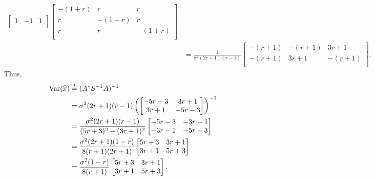 \documentclass{homework}
\begin{document}
\begin{solution}
\begin{align*}
\begin{bmatrix}
	1 &-1 & 1 \\
      \end{bmatrix}
      \begin{bmatrix} 
	-(1+r) & r & r \\ 
	r & -(1+r) & r \\ 
	r & r & -(1+r) \\ 
      \end{bmatrix} \\
      &=
      \frac{1}{\sigma^2(2r+1)(r -1)}
      \begin{bmatrix}
	-(r+1)&-(r+1)&3r+1\\
	-(r+1)&3r+1&-(r+1)\\ 
      \end{bmatrix}.
\end{align*}
Thus,
\begin{align*} 
    \mathrm{Var}(\widehat x) 
      &\stackrel*=(A^*S^{-1}A)^{-1} \\
      &=
      {\sigma^2(2r+1)(r -1)}
	\left(
	\begin{bmatrix}-5r-3&3r+1\\ 3r+1&-5r-3\\ \end{bmatrix}
	\right)^{-1}\\
      &=
	\frac{\sigma^2(2r+1)(r -1)}{(5r+3)^2 - (3r+1)^2} 
	\begin{bmatrix}-5r-3&-3r-1\\ -3r-1&-5r-3\\ \end{bmatrix}\\
      &=
	\frac{\sigma^2(2r+1)(1 -r)}{8(r+1)(2r + 1)} 
	\begin{bmatrix}5r+3&3r+1\\ 3r+1&5r+3\\ \end{bmatrix}\\
      &=
	\frac{\sigma^2(1 -r)}{8(r+1)} 
	\begin{bmatrix}5r+3&3r+1\\ 3r+1&5r+3\\ \end{bmatrix}.\\
\end{align*}


\end{solution}
\end{document}
